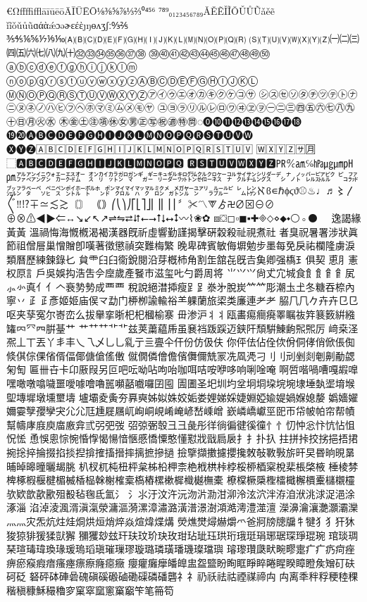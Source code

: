 €ΩﬀﬃﬄāīūēōĀĪŪĒŌ⅛⅜⅝⅞⅓⅔⁰⁴⁵⁶
⁷⁸⁹₀₁₂₃₄₅₆₇₈₉ǍĚẼǏĨǑǓŮŨǎěẽ
ǐĩǒǔůũɑάὰǽɔəɚɛέὲȷŋɵʌʒʃː↉⅖
⅗⅘⅙⅚⅐⅑⅒🄐🄑🄒🄓🄔🄕🄖🄗🄘🄙🄚🄛🄜🄝🄞🄟🄠🄡
🄢🄣🄤🄥🄦🄧🄨🄩㈠㈡㈢㈣㈤㈥㈦㈧㈨㈩㉜㉝㉞㉟㊱㊲㊳
㊴㊵㊶㊷㊸㊹㊺㊻㊼㊽㊾㊿ⓐⓑⓒⓓⓔⓕⓖⓗⓘⓙⓚⓛⓜ
ⓝⓞⓟⓠⓡⓢⓣⓤⓥⓦⓧⓨⓩⒶⒷⒸⒹⒺⒻⒼⒽⒾⒿⓀⓁ
ⓂⓃⓄⓅⓆⓇⓈⓉⓊⓋⓌⓍⓎⓏ㋐㋑㋒㋓㋔㋕㋖㋗㋘㋙㋚
㋛㋜㋝㋞㋟㋠㋡㋢㋣㋤㋥㋦㋧㋨㋩㋪㋫㋬㋭㋮㋯㋰㋱㋲㋳
㋴㋵㋶㋷㋸㋹㋺㋻㋼㋽㋾㊀㊁㊂㊃㊄㊅㊆㊇㊈㊉㊐㊊㊋㊌
㊍㊎㊏㊟㊠㊡㊛㊚㊣㊢㊗㊜㊕㉄◌⓿❿⓫⓬⓭⓮⓯⓰⓱⓲
⓳⓴🅐🅑🅒🅓🅔🅕🅖🅗🅘🅙🅚🅛🅜🅝🅞🅟🅠🅡🅢🅣🅤🅥🅦
🅧🅨🅩🄰🄱🄲🄳🄴🄵🄶🄷🄸🄹🄺🄻🄼🄽🄾🄿🅀🅁🅂🅃🅄🅅
🅆🅇🅈🅉🈂🈷⃞⬚🅰🅱🅲🅳🅴🅵🅶🅷🅸🅹🅺🅻🅼🅽🅾🅿🆀
🆁🆂🆃🆄🆅🆆🆇🆈🆉㏚℀㏂℅㍱㎍㎛㏗㏘㌁㌂㌄㌆㌈㌇㌊
㌉㌋㌌㌎㌏㌐㌑㌒㌓㌗㌙㌚㌛㌜㌝㌟㌠㌡㌤㌥㌨㌩㌭㌮㌯
㌰㌲㌴㌵㌼㌷㌸㌺㌽㍁㌾㌿㍀㍃㍄㍅㍆㍈㍋㍌㍏㍐㍒㍔㍓
㍕㍖ℵϐ∊ℏϕϛϑ⚾♨♩♬〻〳〴〵‼⁉∓≃≲≳〘〙
｟｠⎛⎝⎞⎠⎡⎣⎤⎦⎜⎟⎢⎥⎪〞✂〽⮗ゟ࿖∅⊠⊖⊘
⊕⊗⚠◀▶⇐↔↘↙↖↗⇌⇋⮂⮃⭠⭢⭡⭣⭤⭥〰⌇❀✿
⧈⛋◻▫◼▪✚🞜⬦⋄⬥⬩⚪◦⚫❖𛄲𛅕﹅﹆逸謁緣⿈黃
溫禍悔海慨槪渴褐漢器既祈虛響勤謹揭擊硏穀殺祉視煮社
者臭祝暑署涉狀眞節祖僧層巢憎贈卽嘆著徵懲禎突難梅繁
晚卑碑賓敏侮塀勉步墨每免戾祐欄隆虜淚類曆歷練鍊錄𠤎
貟⻗⺽𦥑𫟘銳閱沿芽槪杮⻆割𦈢舘㐂旣𠮷𩵋卿强𫞎⺩俱契
恵⺼憲权𠩤訁戶吳娛抅浩吿𫝆𫝷歲產䬸巿滋玺𠮟勺爵周将
⺌𭕄⺍尙𠀋宂城⻝⻟飠⻞𩙿㞍⺗㣺真⺅亻𠆢𮕩㔟𫝑成⻃覀
稅說絕澘揷瘦⻊𧾷𣳾㐧脫炭⺮𥫗彫潮圡𡈽冬糖吞㮈內寧丷
⺪𤴔彥姬姬庙㑨龴勐门𫞉栁諭輸𥙿⺷躶蘭旅鿄类廉連⺹耂
𦚰⺇𠘨𠂊𠦄卉⺋㔾呕夹孶寃尔㟢峦么拔𦦙挛晣𣏌杞槶榆𪧦
毌渗沪⺦丬瓯畵痬癎㾱睪瞩鿆筓𫞽䉤絣繈𮉸𠔿⺳𦉪腁䑓艹
⺾艹⺿艹⻀兹荚䔥藴𠂰虽㐮裆䟦𮛪迈𨦇𨸗頹騈鯟𫠚𤋮𤋮厉
﨑桒𣲾𠘑丄丅丟丫丯丰乀乁乄⺃乚乿亍亖亹仐仠份仿伋伕
你伻佉佔佺佽佾侗侾俏俽倀倁倐倛倧倮偗偦偪倻傏傖傜僌
僦僩僯儈儋儐儛儞兟冡冼凮凴刁⺉刂刓剉剡剦劓勈勰匊匋
匾卌卋卡卬厫叚另叵吧呍呦呫呴咍咖咡咭咹咿哆响唎唫唵
啊啠喈喎嘈嘎嘏嘷嘿噉噋噏噦噩噯噱噲嚕嚚嚬嚭嚱囉囝囤
圊圕圣圯圳圴坌坰垌垜垸埦埭埵埶埿堉堠堲塼墀墩壎壐壔
壚壩夌夤夯奡奭姊姒姝姣姤娄娌娣婇婕婣婭婾媞媧媬媳嫠
嬀嬙嬥嬭孁孼孾孿宊⺏尣尫尰屣屩屼峋峒峴崤崦嵃嵆嵊嶒
嶔嶙嶠巘巠巸帀帒帔帕帘帮幘幫幬庨庪庾庿廒弇弎弜弝弢
弨弶弻彀⼹彐彘彤徉徜徧徤徯徸⺖忄忉忡忩忭忼怗怚怳恡
恿悞悤悰惋惛惸愒愓愔愜慼憍憟憨懂懟戕戩扃扆⺘扌扑扖
拄拼挊挍挘挹捂捃捥捴捽掄掇掐掞揑揜搉搐搢摔摛摭摻撾
撿擥擷擻攄攖攙敇敧斁斅旂旰旲昬晌晛晜晡晫暤曈曬朅朓
朳杈杌杶杻枰枲柹柗柙柰栬栰栱桛桲桵桺梄梥梲棐棖棨棭
棰棱棼椑椓椵椻楗楣楲楿榀榦榭榷槖槗樁樏樕樨樴樾橅橐
橑橖橛檃檉檑檝檞檟櫜櫧櫬欞欤欵歆歖歠殂殾毡毱氐氳氵
⺡⺢汙汶汻沅沕沜泐泔泖泠泫泬泮洊洎洑洮浗浞浥涂涿淄
淊淖淩渢湑滇滊滎滽漚漪漯漳潚潞潢潽澋澍澒澔澚澧澨澶
濚濞瀹瀼灔灝灞灤⺣灬灾炁炕炷烓烔烘烜焇焠焱煊煒煠煹
熒燋燓燖爀爝爫爸牁牓牕牖牜犍⺨犭犴狇狻猄猅猨猱獃獬
獼玃玅玆玕玞玟玠玦玫玵玷玼珏珙珩珴珽琄琊琚琛琤琨琬
琯琰琱琹瑄瑇瑋瑍瑑瑗瑦瑫瑱璀璅璆璇璐璘璜璠璣璨璫璵
璿瓈瓚瓞畎畹疁疐⽧疒疓疴痤痹瘀瘊瘕瘖瘙瘞瘭瘵癃癋癥
癭癯癱癴皤皥盅盌盬盼眴眶睜睟睠睲睽瞕瞪矦矰矴砆砢砭
砮砰砵硨碞磈磌磎磤磠磡磲磷磻礱⺭礻礽祅祛祜禋禖禘⽱
禸离秊秚稃稉稑稞稭稹穅穌穝穭穸窠窣窳窻窼竆笇笔笧笱
